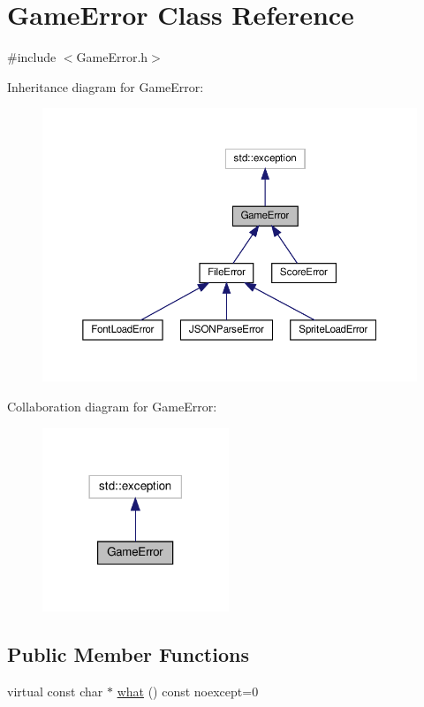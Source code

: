 \hypertarget{classGameError}{}\section{Game\+Error Class Reference}
\label{classGameError}


{\ttfamily \#include $<$Game\+Error.\+h$>$}



Inheritance diagram for Game\+Error\+:\nopagebreak
\begin{figure}[H]
\begin{center}
\leavevmode
\includegraphics[width=350pt]{classGameError__inherit__graph}
\end{center}
\end{figure}


Collaboration diagram for Game\+Error\+:\nopagebreak
\begin{figure}[H]
\begin{center}
\leavevmode
\includegraphics[width=158pt]{classGameError__coll__graph}
\end{center}
\end{figure}
\subsection*{Public Member Functions}
\begin{DoxyCompactItemize}
\item 
virtual const char $\ast$ \hyperlink{classGameError_afbe93d6a2023f2824be2733aff9e86cb}{what} () const noexcept=0
\end{DoxyCompactItemize}


